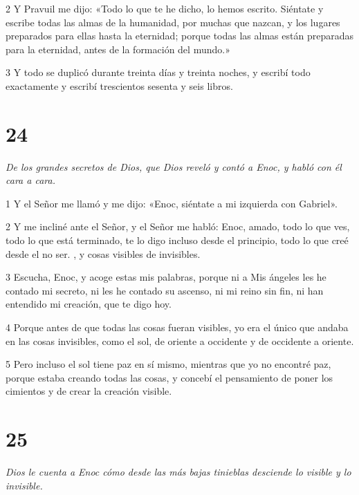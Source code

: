 \par 2 Y Pravuil me dijo: «Todo lo que te he dicho, lo hemos escrito. Siéntate y escribe todas las almas de la humanidad, por muchas que nazcan, y los lugares preparados para ellas hasta la eternidad; porque todas las almas están preparadas para la eternidad, antes de la formación del mundo.»

\par 3 Y todo se duplicó durante treinta días y treinta noches, y escribí todo exactamente y escribí trescientos sesenta y seis libros.

\chapter{24}

\par \textit{De los grandes secretos de Dios, que Dios reveló y contó a Enoc, y habló con él cara a cara.}

\par 1 Y el Señor me llamó y me dijo: «Enoc, siéntate a mi izquierda con Gabriel».

\par 2 Y me incliné ante el Señor, y el Señor me habló: Enoc, amado, todo lo que ves, todo lo que está terminado, te lo digo incluso desde el principio, todo lo que creé desde el no ser. , y cosas visibles de invisibles.

\par 3 Escucha, Enoc, y acoge estas mis palabras, porque ni a Mis ángeles les he contado mi secreto, ni les he contado su ascenso, ni mi reino sin fin, ni han entendido mi creación, que te digo hoy.

\par 4 Porque antes de que todas las cosas fueran visibles, yo era el único que andaba en las cosas invisibles, como el sol, de oriente a occidente y de occidente a oriente.

\par 5 Pero incluso el sol tiene paz en sí mismo, mientras que yo no encontré paz, porque estaba creando todas las cosas, y concebí el pensamiento de poner los cimientos y de crear la creación visible.

\chapter{25}

\par \textit{Dios le cuenta a Enoc cómo desde las más bajas tinieblas desciende lo visible y lo invisible.}

